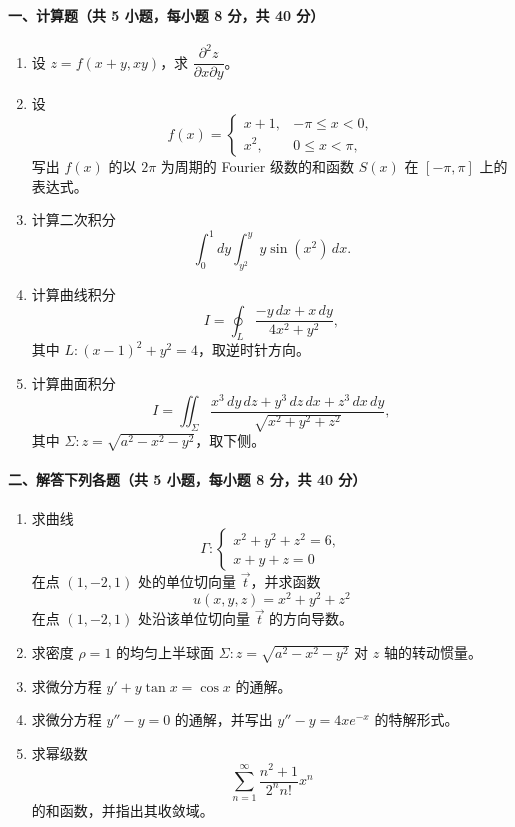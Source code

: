\paragraph*{一、计算题（共 5 小题，每小题 8 分，共 40 分）}
\begin{enumerate}
  \item 设 $z=f(x+y,xy)$，求 $\dfrac{\partial^2z}{\partial x\partial y}$。
  \item 设
  \[
    f(x)=
    \begin{cases}
      x+1, & -\pi\le x<0,\\
      x^2, & 0\le x<\pi,
    \end{cases}
  \]
  写出 $f(x)$ 的以 $2\pi$ 为周期的 Fourier 级数的和函数 $S(x)$ 在 $[-\pi,\pi]$ 上的表达式。
  \item 计算二次积分
  \[
    \int_0^1dy\int_{y^2}^{y}y\sin(x^2)\,dx.
  \]
  \item 计算曲线积分
  \[
    I=\oint_L\frac{-y\,dx+x\,dy}{4x^2+y^2},
  \]
  其中 $L:(x-1)^2+y^2=4$，取逆时针方向。
  \item 计算曲面积分
  \[
    I=\iint_\Sigma \frac{x^3\,dy\,dz+y^3\,dz\,dx+z^3\,dx\,dy}{\sqrt{x^2+y^2+z^2}},
  \]
  其中 $\Sigma:z=\sqrt{a^2-x^2-y^2}$，取下侧。
\end{enumerate}

\paragraph*{二、解答下列各题（共 5 小题，每小题 8 分，共 40 分）}
\begin{enumerate}
  \item 求曲线
  \[
    \Gamma:
    \begin{cases}
      x^2+y^2+z^2=6,\\
      x+y+z=0
    \end{cases}
  \]
  在点 $(1,-2,1)$ 处的单位切向量 $\vec t$，并求函数
  \[
    u(x,y,z)=x^2+y^2+z^2
  \]
  在点 $(1,-2,1)$ 处沿该单位切向量 $\vec t$ 的方向导数。
  \item 求密度 $\rho=1$ 的均匀上半球面 $\Sigma:z=\sqrt{a^2-x^2-y^2}$ 对 $z$ 轴的转动惯量。
  \item 求微分方程 $y'+y\tan x=\cos x$ 的通解。
  \item 求微分方程 $y''-y=0$ 的通解，并写出 $y''-y=4xe^{-x}$ 的特解形式。
  \item 求幂级数
  \[
    \sum_{n=1}^{\infty}\frac{n^2+1}{2^n n!}x^n
  \]
  的和函数，并指出其收敛域。
\end{enumerate}

